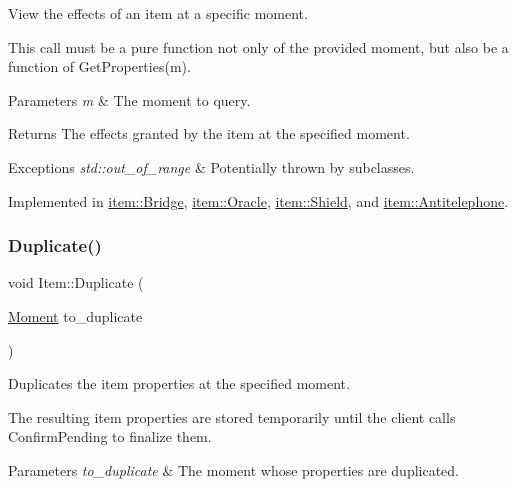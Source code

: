 View the effects of an item at a specific moment. 

This call must be a pure function not only of the provided moment, but also be a function of {\ttfamily Get\+Properties(m)}. 
\begin{DoxyParams}{Parameters}
{\em m} & The moment to query. \\
\hline
\end{DoxyParams}
\begin{DoxyReturn}{Returns}
The effects granted by the item at the specified moment. 
\end{DoxyReturn}

\begin{DoxyExceptions}{Exceptions}
{\em std\+::out\+\_\+of\+\_\+range} & Potentially thrown by subclasses. \\
\hline
\end{DoxyExceptions}


Implemented in \hyperlink{classitem_1_1_bridge_a644ccbcba577629cd0f07066e64afac1}{item\+::\+Bridge}, \hyperlink{classitem_1_1_oracle_ade8c5db0ab73bfa61d5dbe2c9c405f5c}{item\+::\+Oracle}, \hyperlink{classitem_1_1_shield_ae4a97ec6084467b7c87c91fdabcd9e94}{item\+::\+Shield}, and \hyperlink{classitem_1_1_antitelephone_ae8f9abbbb65d23970fb3b61393bda141}{item\+::\+Antitelephone}.

\mbox{\label{classitem_1_1_item_ab31c1b5e2b0993341e7a268693960b90}} 
\subsubsection{\texorpdfstring{Duplicate()}{Duplicate()}}
{\footnotesize\ttfamily void Item\+::\+Duplicate (\begin{DoxyParamCaption}\item[{\hyperlink{classtimeplane_1_1_moment}{Moment}}]{to\+\_\+duplicate }\end{DoxyParamCaption})}



Duplicates the item properties at the specified moment. 

The resulting item properties are stored temporarily until the client calls {\ttfamily Confirm\+Pending} to finalize them. 
\begin{DoxyParams}{Parameters}
{\em to\+\_\+duplicate} & The moment whose properties are duplicated. \\
\hline
\end{DoxyParams}

